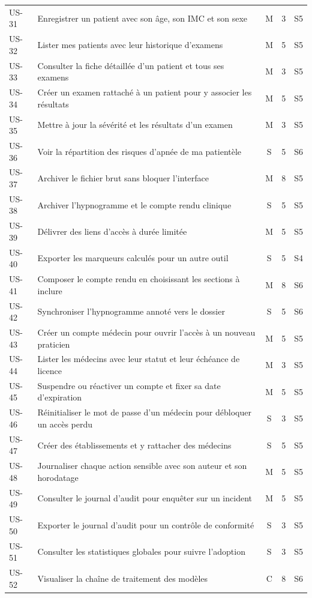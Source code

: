 \begin{longtable}{@{}p{1.25cm}L{9.1cm}cp{0.75cm}p{0.9cm}@{}}
US-31 & Enregistrer un patient avec son âge, son IMC et son sexe & M & 3 & S5 \\
US-32 & Lister mes patients avec leur historique d'examens & M & 5 & S5 \\
US-33 & Consulter la fiche détaillée d'un patient et tous ses examens & M & 3 & S5 \\
US-34 & Créer un examen rattaché à un patient pour y associer les résultats
& M & 5 & S5 \\
US-35 & Mettre à jour la sévérité et les résultats d'un examen & M & 3 & S5 \\
US-36 & Voir la répartition des risques d'apnée de ma patientèle & S & 5 & S6 \\

US-37 & Archiver le fichier brut sans bloquer l'interface & M & 8 & S5 \\
US-38 & Archiver l'hypnogramme et le compte rendu clinique & S & 5 & S5 \\
US-39 & Délivrer des liens d'accès à durée limitée & M & 5 & S5 \\
US-40 & Exporter les marqueurs calculés pour un autre outil & S & 5 & S4 \\
US-41 & Composer le compte rendu en choisissant les sections à inclure & M & 8 & S6 \\
US-42 & Synchroniser l'hypnogramme annoté vers le dossier & S & 5 & S6 \\

US-43 & Créer un compte médecin pour ouvrir l'accès à un nouveau praticien & M & 5 & S5 \\
US-44 & Lister les médecins avec leur statut et leur échéance de licence & M & 3 & S5 \\
US-45 & Suspendre ou réactiver un compte et fixer sa date d'expiration & M & 5 & S5 \\
US-46 & Réinitialiser le mot de passe d'un médecin pour débloquer un accès perdu
& S & 3 & S5 \\
US-47 & Créer des établissements et y rattacher des médecins & S & 5 & S5 \\
US-48 & Journaliser chaque action sensible avec son auteur et son horodatage
& M & 5 & S5 \\
US-49 & Consulter le journal d'audit pour enquêter sur un incident & M & 5 & S5 \\
US-50 & Exporter le journal d'audit pour un contrôle de conformité & S & 3 & S5 \\
US-51 & Consulter les statistiques globales pour suivre l'adoption & S & 3 & S5 \\
US-52 & Visualiser la chaîne de traitement des modèles & C & 8 & S6 \\


\end{longtable}
